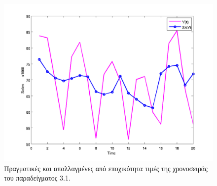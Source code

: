 \begin{figure} [ht]
  \centering
  \includegraphics[totalheight=4in,angle=0]{graff3.png}
  \caption{Πραγματικές και απαλλαγμένες από εποχικότητα τιμές της χρονοσειράς του παραδείγματος 3.1.}
\end{figure}

